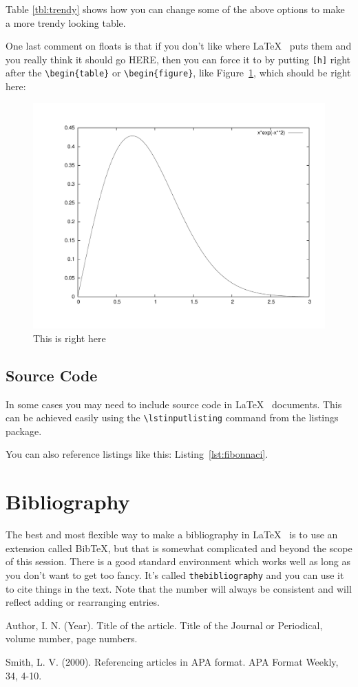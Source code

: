 \documentclass[twocolumn,10 pt,showpacs,preprintnumbers,amsmath,amssymb]{revtex4-1}
\begin{document}
Table \ref{tbl:trendy} shows how you can change some of the above
options to make a more trendy looking table.

One last comment on floats is that if you don't like where \LaTeX~ puts
them and you really think it should go HERE, then you can force it to by
putting \texttt{[h]} right after the \verb_\begin{table}_ or
\verb_\begin{figure}_, like Figure~\ref{fig:here}, which should be right
here:
\begin{figure}[h]
    \centering
    \includegraphics[scale=0.25,angle=-90]{graph.pdf}
    \caption{This is right here}
    \label{fig:here}
\end{figure}

\subsection{Source Code}

In some cases you may need to include source code in \LaTeX~ documents. This can be achieved easily using the \verb_\lstinputlisting_ command from the listings package.

You can also reference listings like this: Listing~\ref{lst:fibonnaci}.

\section{Bibliography}

The best and most flexible way to make a bibliography in \LaTeX~ is to use
an extension called Bib\TeX, but that is somewhat complicated and beyond
the scope of this session. There is a good standard environment which
works well as long as you don't want to get too fancy. It's called
\texttt{thebibliography} and you can use it to cite things in the
text\cite{smith}. Note that the number will always be consistent and
will reflect adding or rearranging entries\cite{author}.

\begin{thebibliography}{99}

 Author, I. N. (Year). Title of the article. Title of the Journal or Periodical, volume number, page numbers.

 Smith, L. V. (2000). Referencing articles in APA format. APA Format Weekly, 34, 4-10.

\end{thebibliography}
\end{document}
